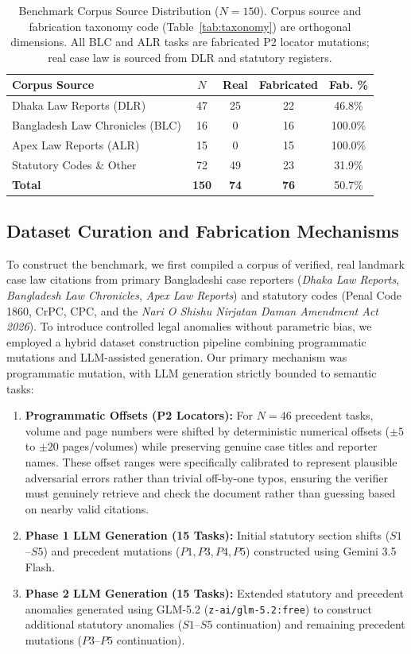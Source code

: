 \documentclass[conference]{IEEEtran}
\begin{document}
\begin{table}[htbp]
\caption{Benchmark Corpus Source Distribution ($N=150$). Corpus source and fabrication taxonomy code (Table~\ref{tab:taxonomy}) are orthogonal dimensions. All BLC and ALR tasks are fabricated P2 locator mutations; real case law is sourced from DLR and statutory registers.}
\label{tab:corpus_distribution}
\centering
\begin{tabular}{lcccc}
\toprule
\textbf{Corpus Source} & \textbf{$N$} & \textbf{Real} & \textbf{Fabricated} & \textbf{Fab. \%} \\
\midrule
Dhaka Law Reports (DLR) & 47 & 25 & 22 & 46.8\% \\
Bangladesh Law Chronicles (BLC) & 16 & 0 & 16 & 100.0\% \\
Apex Law Reports (ALR) & 15 & 0 & 15 & 100.0\% \\
Statutory Codes \& Other & 72 & 49 & 23 & 31.9\% \\
\midrule
\textbf{Total} & \textbf{150} & \textbf{74} & \textbf{76} & 50.7\% \\
\bottomrule
\end{tabular}
\end{table}

\subsection{Dataset Curation and Fabrication Mechanisms}
To construct the benchmark, we first compiled a corpus of verified, real landmark case law citations from primary Bangladeshi case reporters (\textit{Dhaka Law Reports}, \textit{Bangladesh Law Chronicles}, \textit{Apex Law Reports}) and statutory codes (Penal Code 1860, CrPC, CPC, and the \textit{Nari O Shishu Nirjatan Daman Amendment Act 2026}). To introduce controlled legal anomalies without parametric bias, we employed a hybrid dataset construction pipeline combining programmatic mutations and LLM-assisted generation. Our primary mechanism was programmatic mutation, with LLM generation strictly bounded to semantic tasks:
\begin{enumerate}
\item \textbf{Programmatic Offsets (P2 Locators):} For $N=46$ precedent tasks, volume and page numbers were shifted by deterministic numerical offsets ($\pm 5$ to $\pm 20$ pages/volumes) while preserving genuine case titles and reporter names. These offset ranges were specifically calibrated to represent plausible adversarial errors rather than trivial off-by-one typos, ensuring the verifier must genuinely retrieve and check the document rather than guessing based on nearby valid citations.
\item \textbf{Phase 1 LLM Generation (15 Tasks):} Initial statutory section shifts ($S1$--$S5$) and precedent mutations ($P1, P3, P4, P5$) constructed using Gemini 3.5 Flash.
\item \textbf{Phase 2 LLM Generation (15 Tasks):} Extended statutory and precedent anomalies generated using GLM-5.2 (\texttt{z-ai/glm-5.2:free}) to construct additional statutory anomalies ($S1$--$S5$ continuation) and remaining precedent mutations ($P3$--$P5$ continuation).
\end{enumerate}
\end{document}
